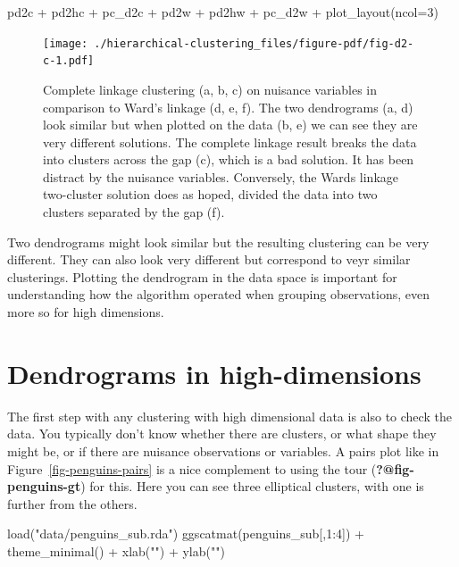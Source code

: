 \documentclass[
  letterpaper,
]{book}
\newenvironment{Shaded}{\begin{snugshade}}{\end{snugshade}}
\newcommand{\AttributeTok}[1]{\textcolor[rgb]{0.40,0.45,0.13}{#1}}
\newcommand{\DecValTok}[1]{\textcolor[rgb]{0.68,0.00,0.00}{#1}}
\newcommand{\FunctionTok}[1]{\textcolor[rgb]{0.28,0.35,0.67}{#1}}
\newcommand{\NormalTok}[1]{\textcolor[rgb]{0.00,0.23,0.31}{#1}}
\newcommand{\SpecialCharTok}[1]{\textcolor[rgb]{0.37,0.37,0.37}{#1}}
\newcommand{\StringTok}[1]{\textcolor[rgb]{0.13,0.47,0.30}{#1}}
\begin{document}
\begin{Shaded}
\begin{Highlighting}[]
\NormalTok{pd2c }\SpecialCharTok{+}\NormalTok{ pd2hc }\SpecialCharTok{+}\NormalTok{ pc\_d2c }\SpecialCharTok{+} 
\NormalTok{  pd2w }\SpecialCharTok{+}\NormalTok{ pd2hw }\SpecialCharTok{+}\NormalTok{ pc\_d2w }\SpecialCharTok{+}
  \FunctionTok{plot\_layout}\NormalTok{(}\AttributeTok{ncol=}\DecValTok{3}\NormalTok{)}
\end{Highlighting}
\end{Shaded}

\begin{figure}[H]

{\centering \texttt{[image: ./hierarchical-clustering\_files/figure-pdf/fig-d2-c-1.pdf]}

}

\caption{\label{fig-d2-c}Complete linkage clustering (a, b, c) on
nuisance variables in comparison to Ward's linkage (d, e, f). The two
dendrograms (a, d) look similar but when plotted on the data (b, e) we
can see they are very different solutions. The complete linkage result
breaks the data into clusters across the gap (c), which is a bad
solution. It has been distract by the nuisance variables. Conversely,
the Wards linkage two-cluster solution does as hoped, divided the data
into two clusters separated by the gap (f).}

\end{figure}

Two dendrograms might look similar but the resulting clustering can be
very different. They can also look very different but correspond to veyr
similar clusterings. Plotting the dendrogram in the data space is
important for understanding how the algorithm operated when grouping
observations, even more so for high dimensions.

\hypertarget{dendrograms-in-high-dimensions}{%
\section{Dendrograms in
high-dimensions}\label{dendrograms-in-high-dimensions}}

The first step with any clustering with high dimensional data is also to
check the data. You typically don't know whether there are clusters, or
what shape they might be, or if there are nuisance observations or
variables. A pairs plot like in Figure~\ref{fig-penguins-pairs} is a
nice complement to using the tour (\textbf{?@fig-penguins-gt}) for this.
Here you can see three elliptical clusters, with one is further from the
others.

\begin{Shaded}
\begin{Highlighting}[]
\FunctionTok{load}\NormalTok{(}\StringTok{"data/penguins\_sub.rda"}\NormalTok{)}
\FunctionTok{ggscatmat}\NormalTok{(penguins\_sub[,}\DecValTok{1}\SpecialCharTok{:}\DecValTok{4}\NormalTok{]) }\SpecialCharTok{+} 
  \FunctionTok{theme\_minimal}\NormalTok{() }\SpecialCharTok{+}
  \FunctionTok{xlab}\NormalTok{(}\StringTok{""}\NormalTok{) }\SpecialCharTok{+} \FunctionTok{ylab}\NormalTok{(}\StringTok{""}\NormalTok{)}
\end{Highlighting}
\end{Shaded}
\end{document}

